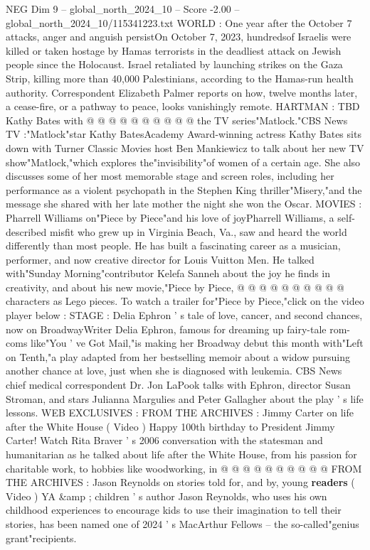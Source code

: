\begin{textsample}{NEG Dim 9 – global\_north\_2024\_10 – Score -2.00 – global\_north\_2024\_10/115341223.txt}
WORLD : One year after the October 7 attacks, anger and anguish persistOn October 7, 2023, hundredsof Israelis were killed or taken hostage by Hamas terrorists in the deadliest attack on Jewish people since the Holocaust.
Israel retaliated by launching strikes on the Gaza Strip, killing more than 40,000 Palestinians, according to the Hamas-run health authority.
Correspondent Elizabeth Palmer reports on how, twelve months later, a cease-fire, or a pathway to peace, looks vanishingly remote.
HARTMAN : TBD Kathy Bates with @ @ @ @ @ @ @ @ @ @ the TV series"Matlock."CBS News TV :"Matlock"star Kathy BatesAcademy Award-winning actress Kathy Bates sits down with Turner Classic Movies host Ben Mankiewicz to talk about her new TV show"Matlock,"which explores the"invisibility"of women of a certain age.
She also discusses some of her most memorable stage and screen roles, including her performance as a violent psychopath in the Stephen King thriller"Misery,"and the message she shared with her late mother the night she won the Oscar.
MOVIES : Pharrell Williams on"Piece by Piece"and his love of joyPharrell Williams, a self-described misfit who grew up in Virginia Beach, Va., saw and heard the world differently than most people.
He has built a fascinating career as a musician, performer, and now creative director for Louis Vuitton Men.
He talked with"Sunday Morning"contributor Kelefa Sanneh about the joy he finds in creativity, and about his new movie,"Piece by Piece, @ @ @ @ @ @ @ @ @ @ characters as Lego pieces.
To watch a trailer for"Piece by Piece,"click on the video player below : STAGE : Delia Ephron ' s tale of love, cancer, and second chances, now on BroadwayWriter Delia Ephron, famous for dreaming up fairy-tale rom-coms like"You ' ve Got Mail,"is making her Broadway debut this month with"Left on Tenth,"a play adapted from her bestselling memoir about a widow pursuing another chance at love, just when she is diagnosed with leukemia.
CBS News chief medical correspondent Dr.
Jon LaPook talks with Ephron, director Susan Stroman, and stars Julianna Margulies and Peter Gallagher about the play ' s life lessons.
WEB EXCLUSIVES : FROM THE ARCHIVES : Jimmy Carter on life after the White House ( Video ) Happy 100th birthday to President Jimmy Carter!
Watch Rita Braver ' s 2006 conversation with the statesman and humanitarian as he talked about life after the White House, from his passion for charitable work, to hobbies like woodworking, in @ @ @ @ @ @ @ @ @ @ FROM THE ARCHIVES : Jason Reynolds on stories told for, and by, young \textbf{readers} ( Video ) YA \&amp ; children ' s author Jason Reynolds, who uses his own childhood experiences to encourage kids to use their imagination to tell their stories, has been named one of 2024 ' s MacArthur Fellows -- the so-called"genius grant"recipients.

\end{textsample}
